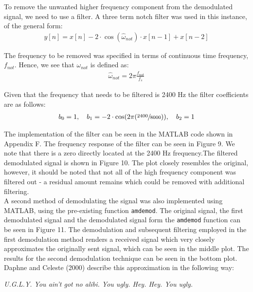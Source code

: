 \documentclass{article}
\begin{document}
To remove the unwanted higher frequency component from the demodulated signal, we need to use a filter. A three term notch filter was used in this instance, of the general form:
\begin{align*}
	y[n] = x[n] - 2 \cdot \cos (\hat{\omega}_{not}) \cdot x[n-1] + x[n - 2]
\end{align*}

The frequency to be removed was specified in terms of continuous time frequency, $f_{not}$. Hence, we see that $\omega_{not}$ is defined as:
\begin{align*}
	\hat{\omega}_{not} = 2 \pi \frac{f_{not}}{f_s}
\end{align*}

Given that the frequency that needs to be filtered is 2400 $\si{\hertz}$ the filter coefficients are as follows:
\begin{align*}
	b_0 = 1, \quad b_1 = -2 \cdot \cos (2 \pi (\sfrac{2400}{8000})), \quad b_2 = 1
\end{align*} 

The implementation of the filter can be seen in the MATLAB code shown in Appendix F. The frequency response of the filter can be seen in Figure 9. We note that there is a zero directly located at the 2400 $\si{\hertz}$ frequency.The filtered demodulated signal is shown in Figure 10. The plot closely resembles the original, however, it should be noted that not all of the high frequency component was filtered out - a residual amount remains which could be removed with additional filtering.\\

A second method of demodulating the signal was also implemented using MATLAB, using the pre-existing function \verb|amdemod|. The original signal, the first demodulated signal and the demodulated signal form the \verb|amdemod| function can be seen in Figure 11. The demodulation and subsequent filtering employed in the first demodulation method renders a received signal which very closely approximates the originally sent signal, which can be seen in the middle plot. The results for the second demodulation technique can be seen in the bottom plot. Daphne and Celeste (2000) describe this approximation in the following way:

\begin{center}
	\textit{U.G.L.Y. You ain't got no alibi. You ugly. Hey. Hey. You ugly.}
\end{center}
\end{document}
